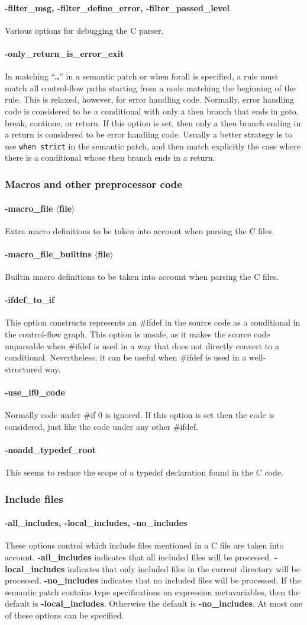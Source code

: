 \documentclass{article}
\newcommand{\normal}[2]{\paragraph*{\makebox[0in][r]{\BigLowerDiamond\,\,} {{#1}}} {#2}}
\newcommand{\rare}[2]{\paragraph*{\makebox[0in][r]{\BigDiamondshape\,\,} {{#1}}} {#2}}
\newcommand{\developer}[2]{\paragraph*{{#1}} {#2}}
\begin{document}
\developer{-filter\_msg, -filter\_define\_error,
  -filter\_passed\_level}{Various options for debugging the C parser.}

\developer{-only\_return\_is\_error\_exit}{In matching ``{\tt{\ldots}}'' in
  a semantic patch or when forall is specified, a rule must match all
  control-flow paths starting from a node matching the beginning of the
  rule.  This is relaxed, however, for error handling code.  Normally, error
  handling code is considered to be a conditional with only a then branch
  that ends in goto, break, continue, or return.  If this option is set,
  then only a then branch ending in a return is considered to be error
  handling code.  Usually a better strategy is to use {\tt when strict} in
  the semantic patch, and then match explicitly the case where there is a
  conditional whose then branch ends in a return.}

\subsubsection*{Macros and other preprocessor code}

\normal{-macro\_file $\langle$file$\rangle$}{
  Extra macro definitions to be taken into account when parsing the C
  files.}

\normal{-macro\_file\_builtins $\langle$file$\rangle$}{
  Builtin macro definitions to be taken into account when parsing the C
  files.}

\rare{-ifdef\_to\_if}{ This option constructs represents an \#ifdef in
the source code as a conditional in the control-flow graph.  This option is
unsafe, as it makes the source code unparsable when \#ifdef is used in a
way that does not directly convert to a conditional.  Nevertheless, it can
be useful when \#ifdef is used in a well-structured way.}

\rare{-use\_if0\_code}{ Normally code under \#if 0 is ignored.  If this
option is set then the code is considered, just like the code under any
other \#ifdef.}

\developer{-noadd\_typedef\_root}{This seems to reduce the scope of a
  typedef declaration found in the C code.}

\subsubsection*{Include files}

\normal{-all\_includes, -local\_includes, -no\_includes}{
These options control which include files mentioned in a C file are taken into
account.  {\bf -all\_includes} indicates that all included files will be
processed.  {\bf -local\_includes} indicates that only included files in
the current directory will be processed.  {\bf -no\_includes} indicates
that no included files will be processed.  If the semantic patch contains
type specifications on expression metavariables, then the default is {\bf
-local\_includes}.  Otherwise the default is {\bf -no\_includes}.  At most
one of these options can be specified.}
\end{document}
